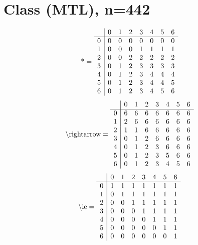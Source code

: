 \documentclass[11pt]{article}
\begin{document}
\section{Class (MTL), n=442}
\[\text{*} = 
\begin{array}{r | r r r r r r r}
 & 0 & 1 & 2 & 3 & 4 & 5 & 6 \\ \hline
0 & 0 & 0 & 0 & 0 & 0 & 0 & 0 \\
1 & 0 & 0 & 0 & 1 & 1 & 1 & 1 \\
2 & 0 & 0 & 2 & 2 & 2 & 2 & 2 \\
3 & 0 & 1 & 2 & 3 & 3 & 3 & 3 \\
4 & 0 & 1 & 2 & 3 & 4 & 4 & 4 \\
5 & 0 & 1 & 2 & 3 & 4 & 4 & 5 \\
6 & 0 & 1 & 2 & 3 & 4 & 5 & 6 \\
\end{array}
\]
\[\text{\textbackslash rightarrow} = 
\begin{array}{r | r r r r r r r}
 & 0 & 1 & 2 & 3 & 4 & 5 & 6 \\ \hline
0 & 6 & 6 & 6 & 6 & 6 & 6 & 6 \\
1 & 2 & 6 & 6 & 6 & 6 & 6 & 6 \\
2 & 1 & 1 & 6 & 6 & 6 & 6 & 6 \\
3 & 0 & 1 & 2 & 6 & 6 & 6 & 6 \\
4 & 0 & 1 & 2 & 3 & 6 & 6 & 6 \\
5 & 0 & 1 & 2 & 3 & 5 & 6 & 6 \\
6 & 0 & 1 & 2 & 3 & 4 & 5 & 6 \\
\end{array}
\]
\[\text{\textbackslash le} = 
\begin{array}{r | r r r r r r r}
 & 0 & 1 & 2 & 3 & 4 & 5 & 6 \\ \hline
0 & 1 & 1 & 1 & 1 & 1 & 1 & 1 \\
1 & 0 & 1 & 1 & 1 & 1 & 1 & 1 \\
2 & 0 & 0 & 1 & 1 & 1 & 1 & 1 \\
3 & 0 & 0 & 0 & 1 & 1 & 1 & 1 \\
4 & 0 & 0 & 0 & 0 & 1 & 1 & 1 \\
5 & 0 & 0 & 0 & 0 & 0 & 1 & 1 \\
6 & 0 & 0 & 0 & 0 & 0 & 0 & 1 \\
\end{array}
\]
\end{document}
